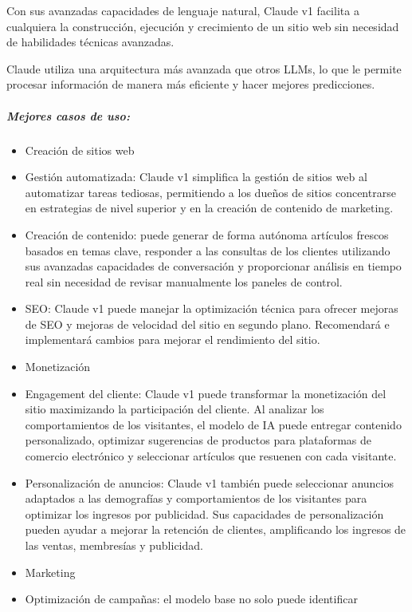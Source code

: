 \documentclass[a4paper12pt]{article}
\begin{document}
Con sus avanzadas capacidades de lenguaje natural, Claude v1 facilita a
cualquiera la construcción, ejecución y crecimiento de un sitio web sin
necesidad de habilidades técnicas avanzadas.

Claude utiliza una arquitectura más avanzada que otros LLMs, lo que le
permite procesar información de manera más eficiente y hacer mejores
predicciones.

\hypertarget{mejores-casos-de-uso-7}{%
\subparagraph{Mejores casos de uso:}\label{mejores-casos-de-uso-7}}

\begin{itemize}
\item
  Creación de sitios web
\item
  Gestión automatizada: Claude v1 simplifica la gestión de sitios web al
  automatizar tareas tediosas, permitiendo a los dueños de sitios
  concentrarse en estrategias de nivel superior y en la creación de
  contenido de marketing.
\item
  Creación de contenido: puede generar de forma autónoma artículos
  frescos basados en temas clave, responder a las consultas de los
  clientes utilizando sus avanzadas capacidades de conversación y
  proporcionar análisis en tiempo real sin necesidad de revisar
  manualmente los paneles de control.
\item
  SEO: Claude v1 puede manejar la optimización técnica para ofrecer
  mejoras de SEO y mejoras de velocidad del sitio en segundo plano.
  Recomendará e implementará cambios para mejorar el rendimiento del
  sitio.
\item
  Monetización
\item
  Engagement del cliente: Claude v1 puede transformar la monetización
  del sitio maximizando la participación del cliente. Al analizar los
  comportamientos de los visitantes, el modelo de IA puede entregar
  contenido personalizado, optimizar sugerencias de productos para
  plataformas de comercio electrónico y seleccionar artículos que
  resuenen con cada visitante.
\item
  Personalización de anuncios: Claude v1 también puede seleccionar
  anuncios adaptados a las demografías y comportamientos de los
  visitantes para optimizar los ingresos por publicidad. Sus capacidades
  de personalización pueden ayudar a mejorar la retención de clientes,
  amplificando los ingresos de las ventas, membresías y publicidad.
\item
  Marketing
\item
  Optimización de campañas: el modelo base no solo puede identificar

\end{itemize}
\end{document}
